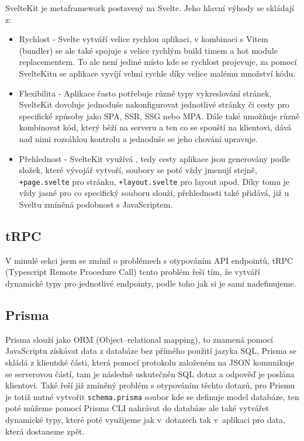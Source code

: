 \documentclass[12pt, a4paper,
openright
]{report}
\begin{document}
SvelteKit je metaframework postavený na Svelte. Jeho hlavní výhody se skládají z:
\begin{itemize}
	\item Rychlost - Svelte vytváří velice rychlou aplikaci, v kombinaci s Vitem (bundler) se ale také spojuje s velice rychlým build timem a hot module replacementem. To ale není jediné místo kde se rychlost projevuje, za pomocí SvelteKitu se aplikace vyvíjí velmi rychle díky velice malému množství  kódu.
	\item Flexibilita - Aplikace často potřebuje různé typy vykreslování stránek, SvelteKit dovoluje jednoduše nakonfigurovat jednotlivé stránky či cesty pro specifické způsoby jako SPA, SSR, SSG nebo MPA. Dále také umožňuje různě kombinovat kód, který běží na serveru a ten co se spouští na klientovi, dává nad nimi rozsáhlou kontrolu a jednoduše se jeho chování upravuje.
	\item Přehlednost - SvelteKit využívá , tedy cesty aplikace jsou generovány podle složek, které vývojář vytvoří, soubory se poté vždy jmenují stejně, \texttt{+page.svelte} pro stránku, \texttt{+layout.svelte} pro layout apod. Díky tomu je vždy jasné pro co specifický souboru slouží, přehlednosti také přidává, již u Sveltu zmíněná podobnost s JavaScriptem.
\end{itemize} 

\subsection{tRPC}
V minulé sekci jsem se zmínil o problémech s otypováním API endpointů, tRPC (Typescript Remote Procedure Call) tento problém řeší tím, že vytváří dynamické typy pro jednotlivé endpointy, podle toho jak si je sami nadefinujeme.

\subsection{Prisma}
Prisma slouží jako ORM (Object–relational mapping), to znamená pomocí JavaScriptu získávat data z databáze bez přímého použití jazyka SQL, Prisma se skládá z klientské části, která pomocí protokolu založeném na JSON komunikuje se serverovou částí, tam je následně uskutečněn SQL dotaz a odpověď je poslána klientovi. Také řeší již zmíněný problém s otypováním těchto dotazů, pro Prismu je totiž nutné vytvořit \texttt{schema.prisma} soubor kde se definuje model databáze, ten poté můžeme pomocí Prisma CLI nahrávat do databáze ale také vytvářet dynamické typy, které poté využijeme jak v~dotazech tak v~aplikaci pro data, která dostaneme zpět.
\end{document}
